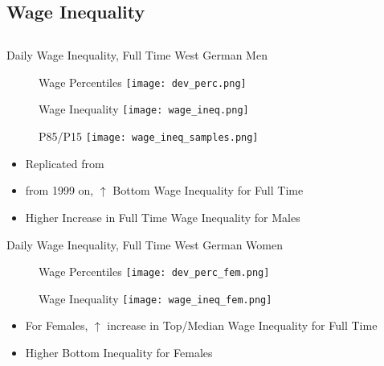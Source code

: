 \documentclass[hyperref={bookmarks=false}]{beamer}
\let\oldcite=\cite
\renewcommand{\cite}[1]{\textcolor[rgb]{.0,.2,.7}{\oldcite{#1}}}
\begin{document}
\begin{appendix}
%


\section{Wage Inequality}
\subsection{}

\begin{frame}
\label{WINEQ}
\end{frame}

\begin{frame}{Daily Wage Inequality, Full Time West German Men}
\begin{figure}[!t]
\centering
\begin{minipage}[b]{0.32\textwidth}{Wage Percentiles}
\centering
\texttt{[image: dev\_perc.png]}
\end{minipage}
\begin{minipage}[b]{0.32\textwidth}{Wage Inequality}
\centering
\texttt{[image: wage\_ineq.png]}
\end{minipage}
\begin{minipage}[b]{0.32\textwidth}{P85/P15}
\centering
\texttt{[image: wage\_ineq\_samples.png]}
\end{minipage}
\end{figure}
\begin{itemize}
\setlength{\itemsep}{0.7 cm}
\item Replicated from \cite{CaHeKl13}
\item from 1999 on, $\uparrow$ Bottom Wage Inequality for Full Time
\item Higher Increase in Full Time Wage Inequality for Males
\end{itemize}
\end{frame}

\begin{frame}{Daily Wage Inequality, Full Time West German Women}
\begin{figure}[!t]
\centering
\begin{minipage}[b]{0.32\textwidth}{Wage Percentiles}
\centering
\texttt{[image: dev\_perc\_fem.png]}
\end{minipage}
\begin{minipage}[b]{0.32\textwidth}{Wage Inequality}
\centering
\texttt{[image: wage\_ineq\_fem.png]}
\end{minipage}
\end{figure}
\begin{itemize}
\setlength{\itemsep}{0.7 cm}
\item For Females, $\uparrow$ increase in Top/Median Wage Inequality for Full Time
\item Higher Bottom Inequality for Females
\end{itemize}
\end{frame}


\end{appendix}
\end{document}
